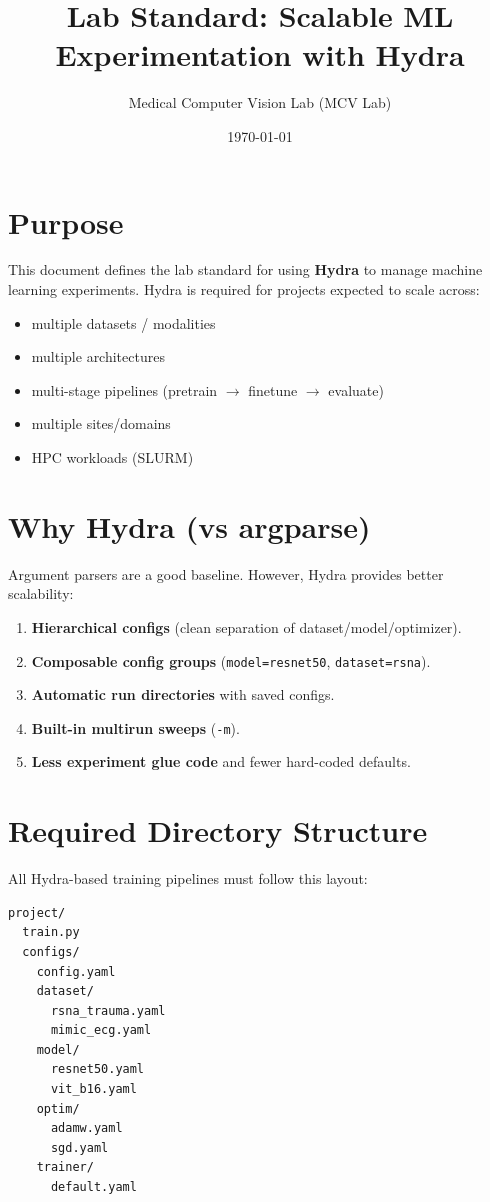 \documentclass[11pt]{article}
\title{\textbf{Lab Standard: Scalable ML Experimentation with Hydra}}
\author{Medical Computer Vision Lab (MCV Lab)}
\date{\today}
\begin{document}
\maketitle

\section{Purpose}
This document defines the lab standard for using \textbf{Hydra} to manage machine learning experiments.
Hydra is required for projects expected to scale across:
\begin{itemize}[nosep]
    \item multiple datasets / modalities
    \item multiple architectures
    \item multi-stage pipelines (pretrain $\rightarrow$ finetune $\rightarrow$ evaluate)
    \item multiple sites/domains
    \item HPC workloads (SLURM)
\end{itemize}

\section{Why Hydra (vs argparse)}
Argument parsers are a good baseline. However, Hydra provides better scalability:
\begin{enumerate}[label=\textbf{H\arabic*.}, leftmargin=*]
    \item \textbf{Hierarchical configs} (clean separation of dataset/model/optimizer).
    \item \textbf{Composable config groups} (\texttt{model=resnet50}, \texttt{dataset=rsna}).
    \item \textbf{Automatic run directories} with saved configs.
    \item \textbf{Built-in multirun sweeps} (\texttt{-m}).
    \item \textbf{Less experiment glue code} and fewer hard-coded defaults.
\end{enumerate}

\section{Required Directory Structure}
All Hydra-based training pipelines must follow this layout:

\begin{lstlisting}
project/
  train.py
  configs/
    config.yaml
    dataset/
      rsna_trauma.yaml
      mimic_ecg.yaml
    model/
      resnet50.yaml
      vit_b16.yaml
    optim/
      adamw.yaml
      sgd.yaml
    trainer/
      default.yaml
\end{lstlisting}
\end{document}
